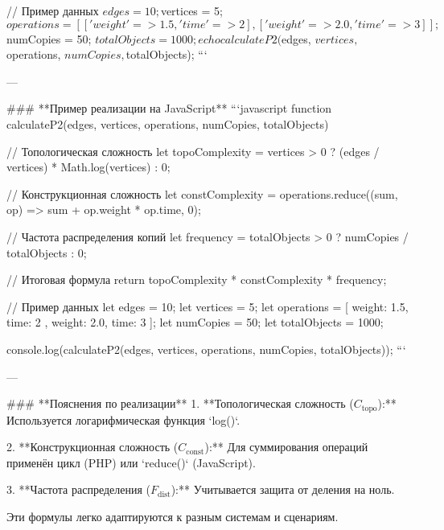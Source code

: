 // Пример данных
$edges = 10;
$vertices = 5;
$operations = [
    ['weight' => 1.5, 'time' => 2],
    ['weight' => 2.0, 'time' => 3]
];
$numCopies = 50;
$totalObjects = 1000;

echo calculateP2($edges, $vertices, $operations, $numCopies, $totalObjects);
```

---

### **Пример реализации на JavaScript**
```javascript
function calculateP2(edges, vertices, operations, numCopies, totalObjects) {
    // Топологическая сложность
    let topoComplexity = vertices > 0 ? (edges / vertices) * Math.log(vertices) : 0;

    // Конструкционная сложность
    let constComplexity = operations.reduce((sum, op) => sum + op.weight * op.time, 0);

    // Частота распределения копий
    let frequency = totalObjects > 0 ? numCopies / totalObjects : 0;

    // Итоговая формула
    return topoComplexity * constComplexity * frequency;
}

// Пример данных
let edges = 10;
let vertices = 5;
let operations = [
    { weight: 1.5, time: 2 },
    { weight: 2.0, time: 3 }
];
let numCopies = 50;
let totalObjects = 1000;

console.log(calculateP2(edges, vertices, operations, numCopies, totalObjects));
```

---

### **Пояснения по реализации**
1. **Топологическая сложность (\( C_\text{topo} \)):**  
   Используется логарифмическая функция `log()`.

2. **Конструкционная сложность (\( C_\text{const} \)):**  
   Для суммирования операций применён цикл (PHP) или `reduce()` (JavaScript).

3. **Частота распределения (\( F_\text{dist} \)):**  
   Учитывается защита от деления на ноль.

Эти формулы легко адаптируются к разным системам и сценариям.
